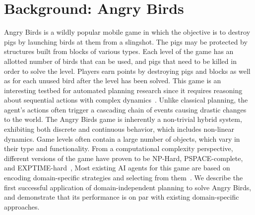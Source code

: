 \documentclass[letterpaper]{article} %
\begin{document}
\section{Background: Angry Birds}
Angry Birds is a wildly popular mobile game in which the objective is to destroy pigs by launching birds at them from a slingshot. The pigs may be protected by structures built from blocks of various types. Each level of the game has an allotted number of birds that can be used, and pigs that need to be killed in order to solve the level.
Players earn points by destroying pigs and blocks as well as for each unused bird after the level has been solved.
This game is an interesting testbed for automated planning research since it
requires reasoning about sequential actions with complex dynamics~\cite{renz2019ai}.
Unlike classical planning, the agent's actions often trigger a cascading chain of events causing drastic changes to the world.
The Angry Birds game is inherently a non-trivial hybrid system, exhibiting both discrete and continuous behavior, which includes non-linear dynamics.
Game levels often contain a large number of objects, which vary in their type and functionality.
From a computational complexity perspective, different versions of the game have proven to be NP-Hard, PSPACE-complete, and EXPTIME-hard~\cite{stephenson2020computational},
Most existing AI agents for this game are based on encoding domain-specific strategies and selecting from them~\cite{borovicka2014datalab,wang2017description}.
We describe the first successful application of domain-independent planning to solve Angry Birds,
and demonstrate that its performance is on par with existing domain-specific approaches.
\end{document}
